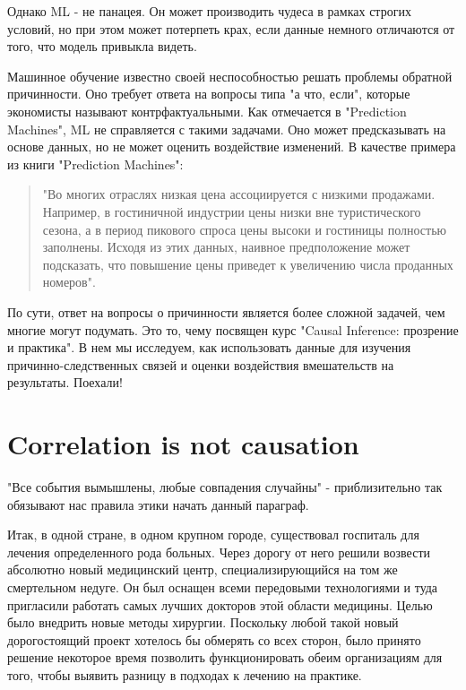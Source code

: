 \documentclass{article}
\newcommand{\coursename}{Causal Inference: прозрение и практика}
\begin{document}
        Однако ML - не панацея. Он может производить чудеса в рамках строгих условий, но при этом может потерпеть крах, если данные немного отличаются от того, что модель привыкла видеть.


        Машинное обучение известно своей неспособностью решать проблемы обратной причинности. Оно требует ответа на вопросы типа "а что, если"{}, которые экономисты называют контрфактуальными. Как отмечается в "Prediction Machines"{}, ML не справляется с такими задачами. Оно может предсказывать на основе данных, но не может оценить воздействие изменений. В качестве примера из книги "Prediction Machines":

        \begin{quote}
            "Во многих отраслях низкая цена ассоциируется с низкими продажами. Например, в гостиничной индустрии цены низки вне туристического сезона, а в период пикового спроса цены высоки и гостиницы полностью заполнены. Исходя из этих данных, наивное предположение может подсказать, что повышение цены приведет к увеличению числа проданных номеров".
        \end{quote}

        По сути, ответ на вопросы о причинности является более сложной задачей, чем многие могут подумать. Это то, чему посвящен курс "\coursename". В нем мы исследуем, как использовать данные для изучения причинно-следственных связей и оценки воздействия вмешательств на результаты. Поехали!

    \section*{Correlation is not causation}

        "Все события вымышлены, любые совпадения случайны" - приблизительно так обязывают нас правила этики начать данный параграф.

        Итак, в одной стране, в одном крупном городе, существовал госпиталь для лечения определенного рода больных. Через дорогу от него решили возвести абсолютно новый медицинский центр, специализирующийся на том же смертельном недуге. Он был оснащен всеми передовыми технологиями и туда пригласили работать самых лучших докторов этой области медицины. Целью было внедрить новые методы хирургии. Поскольку любой такой новый дорогостоящий проект хотелось бы обмерять со всех сторон, было принято решение некоторое время позволить функционировать обеим организациям для того, чтобы выявить разницу в подходах к лечению на практике.
\end{document}

